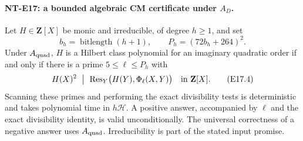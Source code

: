 \paragraph{NT-E17: a bounded algebraic CM certificate under $A_D$.}
Let $H\in\mathbf Z[X]$ be monic and irreducible,
of degree $h\ge1$, and set
\[
 b_h=\operatorname{bitlength}(h+1),\qquad
                     P_h=(72b_h+264)^2.
 \tag{E17.3}
\]
Under $A_{\rm quad}$, $H$ is a Hilbert class
polynomial for an imaginary quadratic order if
and only if there is a prime $5\le\ell\le P_h$ with
\[
 H(X)^2\ \bigm|\ 
       \operatorname{Res}_Y\bigl(H(Y),\Phi_\ell(X,Y)\bigr)
                           \quad\hbox{in }\mathbf Z[X].
 \tag{E17.4}
\]
Scanning these primes and performing the exact
divisibility tests is deterministic and takes
polynomial time in $h\mathcal H$.
A positive answer, accompanied by $\ell$ and
the exact divisibility identity, is valid
unconditionally. The universal correctness of
a negative answer uses $A_{\rm quad}$.
Irreducibility is part of the stated input promise.

